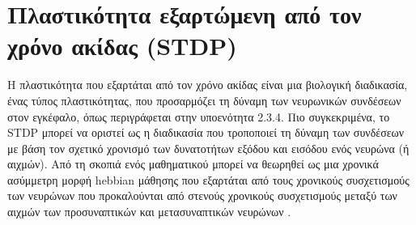 \documentclass[12pt]{report}
\begin{document}
\section{Πλαστικότητα εξαρτώμενη από τον χρόνο ακίδας (\textlatin{STDP})}

Η πλαστικότητα που εξαρτάται από τον χρόνο ακίδας είναι μια βιολογική διαδικασία, ένας τύπος πλαστικότητας, που προσαρμόζει τη δύναμη των νευρωνικών συνδέσεων στον εγκέφαλο, όπως περιγράφεται στην υποενότητα 2.3.4. Πιο συγκεκριμένα, το \textlatin{STDP} μπορεί να οριστεί ως η διαδικασία που τροποποιεί τη δύναμη των συνδέσεων με βάση τον σχετικό χρονισμό των δυνατοτήτων εξόδου και εισόδου ενός νευρώνα (ή αιχμών). Από τη σκοπιά ενός μαθηματικού μπορεί να θεωρηθεί ως μια χρονικά ασύμμετρη μορφή \textlatin{hebbian} μάθησης που εξαρτάται από τους χρονικούς συσχετισμούς των νευρώνων που προκαλούνται από στενούς χρονικούς συσχετισμούς μεταξύ των αιχμών των προσυναπτικών και μετασυναπτικών νευρώνων \cite{stdp2010}.
\end{document}
